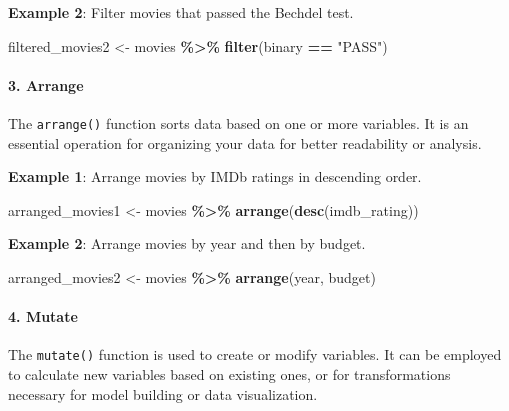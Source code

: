 \documentclass[
  b5paper]{book}
\newenvironment{Shaded}{\begin{snugshade}}{\end{snugshade}}
\newcommand{\FunctionTok}[1]{\textcolor[rgb]{0.13,0.29,0.53}{\textbf{#1}}}
\newcommand{\NormalTok}[1]{#1}
\newcommand{\OtherTok}[1]{\textcolor[rgb]{0.56,0.35,0.01}{#1}}
\newcommand{\SpecialCharTok}[1]{\textcolor[rgb]{0.81,0.36,0.00}{\textbf{#1}}}
\newcommand{\StringTok}[1]{\textcolor[rgb]{0.31,0.60,0.02}{#1}}
\begin{document}
\textbf{Example 2}: Filter movies that passed the Bechdel test.

\begin{Shaded}
\begin{Highlighting}[]
\NormalTok{filtered\_movies2 }\OtherTok{\textless{}{-}}\NormalTok{ movies }\SpecialCharTok{\%\textgreater{}\%}
  \FunctionTok{filter}\NormalTok{(binary }\SpecialCharTok{==} \StringTok{"PASS"}\NormalTok{)}
\end{Highlighting}
\end{Shaded}

\hypertarget{arrange}{%
\paragraph*{3. Arrange}\label{arrange}}

The \texttt{arrange()} function sorts data based on one or more variables. It is an essential operation for organizing your data for better readability or analysis.

\textbf{Example 1}: Arrange movies by IMDb ratings in descending order.

\begin{Shaded}
\begin{Highlighting}[]
\NormalTok{arranged\_movies1 }\OtherTok{\textless{}{-}}\NormalTok{ movies }\SpecialCharTok{\%\textgreater{}\%}
  \FunctionTok{arrange}\NormalTok{(}\FunctionTok{desc}\NormalTok{(imdb\_rating))}
\end{Highlighting}
\end{Shaded}

\textbf{Example 2}: Arrange movies by year and then by budget.

\begin{Shaded}
\begin{Highlighting}[]
\NormalTok{arranged\_movies2 }\OtherTok{\textless{}{-}}\NormalTok{ movies }\SpecialCharTok{\%\textgreater{}\%}
  \FunctionTok{arrange}\NormalTok{(year, budget)}
\end{Highlighting}
\end{Shaded}

\hypertarget{mutate}{%
\paragraph*{4. Mutate}\label{mutate}}

The \texttt{mutate()} function is used to create or modify variables. It can be employed to calculate new variables based on existing ones, or for transformations necessary for model building or data visualization.
\end{document}
